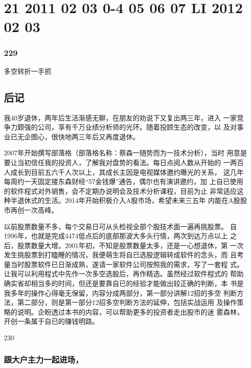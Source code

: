 \documentclass{article}
\begin{document}
\section{21 2011 02 03 0-4 05 06 07 LI 2012 02 03}

\subsubsection{229}

\clearpage

多空转折一手抓

\subsection{后记}

我40岁退休，两年后生活渐感无聊，在朋友的劝说下又复出两三年，进入 一家竞争力颇强的公司，享有千万业绩分析师的光环。随着投顾生态的改变，以 及对事业已无企图心，很快地两三年后又再度退休。

2007年开始撰写部落格（部落格名称：蔡森一随势而为一技术分析），当时 用意是要让当初信任我的投资人，了解我对盘势的看法。每日点阅人数从开始的 一两百人成长到目前五六千人次以上，其成长主因是电视媒体邀约曝光的关系， 这几年每周约一天固定接东森财经“57金钱爆”通告，偶尔也有演讲邀约，加 上自已使用的软件程式对外销售，会不定期办说明会及技术分析课程，目前为止 非常适应这种半退休式的生活。2014年开始积极介入A股市场，希望未来三五年 内能在A股股市再创一次高峰。

以前股票数量不多，每个交易日可从头检视全部个股技术面一遍再挑股票。 自1996年，也就是完成4474低点后的底部那波大多头行情，两次到达万点以上 之后，股票数量大增。2001年初，不知是股票数量太多，还是一心想退休，第 一次发生挑股票到打瞌睡的情况，我便萌生将自已选股逻辑转成软件的念头，而 且考量当时股票软件已日渐成熟，遂请一家软件公司按照我的需求，写了一套程 式。让我可以利用程式中先作一次多空选股后，再作精选。虽然经过软件程式的 帮助确实省却相当多的时间，但还是要靠自已的经验才能做出较正确的判断，本 书是我多年的操作心得毫无保留，内容分成两部分，第一部分讲解12招的多空 判断方法，第二部分，则是第一部分12招多空判断方法的延伸，包括实战运用 及操作策略的说明。企盼透过本书的内容，可以帮助更多的投资者走出股市的迷 雾森林，开创一条属于自已的赚钱明路。

230

\clearpage

\subsubsection{跟大户主力一起进场，}
\end{document}
